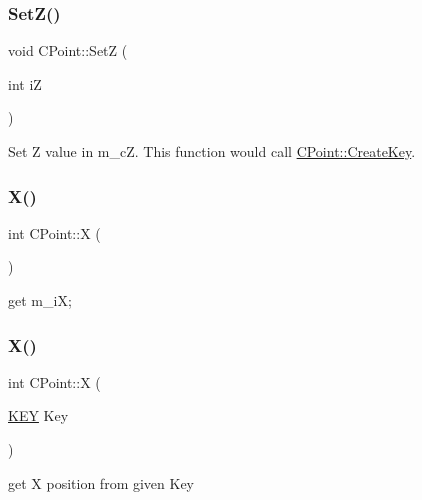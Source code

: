 \subsubsection{\texorpdfstring{SetZ()}{SetZ()}}
{\footnotesize\ttfamily void C\+Point\+::\+SetZ (\begin{DoxyParamCaption}\item[{int}]{iZ }\end{DoxyParamCaption})}

Set Z value in m\+\_\+cZ. This function would call \mbox{\hyperlink{classCPoint_adff246311a759e9c7eaa5f5374dd3643}{C\+Point\+::\+Create\+Key}}. \mbox{\label{classCPoint_aeb92159e1d1045ceab79eea735d22af2}} 
\subsubsection{\texorpdfstring{X()}{X()}\hspace{0.1cm}{\footnotesize\ttfamily [1/2]}}
{\footnotesize\ttfamily int C\+Point\+::X (\begin{DoxyParamCaption}{ }\end{DoxyParamCaption})\hspace{0.3cm}{\ttfamily [inline]}}



get m\+\_\+iX; 

\mbox{\label{classCPoint_aa748e36b6641c6259ca45e1cb7017f58}} 
\subsubsection{\texorpdfstring{X()}{X()}\hspace{0.1cm}{\footnotesize\ttfamily [2/2]}}
{\footnotesize\ttfamily int C\+Point\+::X (\begin{DoxyParamCaption}\item[{\mbox{\hyperlink{res2dmp_8cpp_a8ae9d53f33f46cfcfcb9736e6351452a}{K\+EY}}}]{Key }\end{DoxyParamCaption})\hspace{0.3cm}{\ttfamily [static]}}



get X position from given Key 

\mbox{\label{classCPoint_a8543d7ba2b9d1f9ec3373bd8258a66d0}} 
